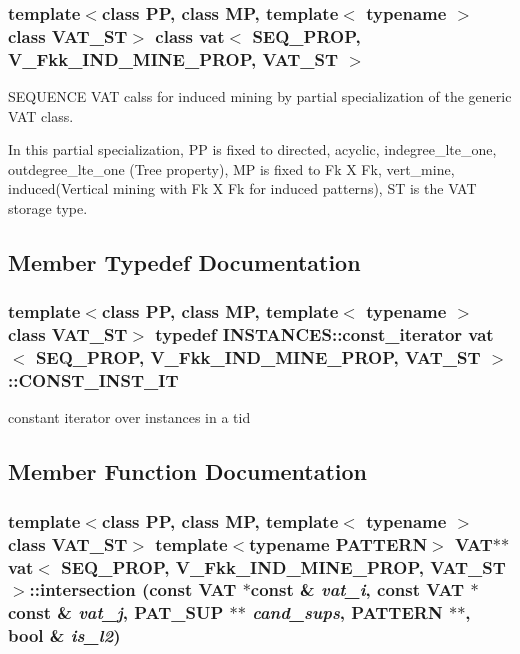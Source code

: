 \subsubsection*{template$<$class PP, class MP, template$<$ typename $>$ class VAT\_\-ST$>$ class vat$<$ SEQ\_\-PROP, V\_\-Fkk\_\-IND\_\-MINE\_\-PROP, VAT\_\-ST $>$}

SEQUENCE VAT calss for induced mining by partial specialization of the generic VAT class. 

In this partial specialization, PP is fixed to directed, acyclic, indegree\_\-lte\_\-one, outdegree\_\-lte\_\-one (Tree property), MP is fixed to Fk X Fk, vert\_\-mine, induced(Vertical mining with Fk X Fk for induced patterns), ST is the VAT storage type. 



\subsection{Member Typedef Documentation}
\subsubsection{\setlength{\rightskip}{0pt plus 5cm}template$<$class PP, class MP, template$<$ typename $>$ class VAT\_\-ST$>$ typedef INSTANCES::const\_\-iterator {\bf vat}$<$ SEQ\_\-PROP, V\_\-Fkk\_\-IND\_\-MINE\_\-PROP, VAT\_\-ST $>$::{\bf CONST\_\-INST\_\-IT}}\label{classvat_3_01SEQ__PROP_00_01V__Fkk__IND__MINE__PROP_00_01VAT__ST_01_4_w8}


constant iterator over instances in a tid 

\subsection{Member Function Documentation}
\subsubsection{\setlength{\rightskip}{0pt plus 5cm}template$<$class PP, class MP, template$<$ typename $>$ class VAT\_\-ST$>$ template$<$typename PATTERN$>$ {\bf VAT}$\ast$$\ast$ {\bf vat}$<$ SEQ\_\-PROP, V\_\-Fkk\_\-IND\_\-MINE\_\-PROP, VAT\_\-ST $>$::intersection (const {\bf VAT} $\ast$const \& {\em vat\_\-i}, const {\bf VAT} $\ast$const \& {\em vat\_\-j}, {\bf PAT\_\-SUP} $\ast$$\ast$ {\em cand\_\-sups}, PATTERN $\ast$$\ast$, bool \& {\em is\_\-l2})\hspace{0.3cm}{\tt  [inline, static]}}\label{classvat_3_01SEQ__PROP_00_01V__Fkk__IND__MINE__PROP_00_01VAT__ST_01_4_e0}


